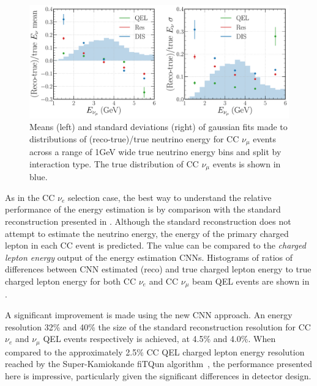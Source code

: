 \begin{figure} %
    \includegraphics[width=\textwidth]{diagrams/7-results/final_energy_numu.pdf}
    \caption[Means and standard deviations of fits to $\nu_{\mu}$ energy distributions]
    {Means (left) and standard deviations (right) of gaussian fits made to distributions of
        (reco-true)/true neutrino energy for CC $\nu_{\mu}$ events across a range of \unit{1}{GeV}
        wide true neutrino energy bins and split by interaction type. The true distribution of CC
        $\nu_{\mu}$ events is shown in blue.}
    \label{fig:final_energy_numu}
\end{figure}

As in the CC $\nu_{e}$ selection case, the best way to understand the relative performance of the
energy estimation is by comparison with the standard \chips reconstruction presented in
. Although the standard reconstruction does not attempt to estimate
the neutrino energy, the energy of the primary charged lepton in each CC event is predicted. The
value can be compared to the \emph{charged lepton energy} output of the energy estimation CNNs.
Histograms of ratios of differences between CNN estimated (reco) and true charged lepton energy to
true charged lepton energy for both CC $\nu_{e}$ and CC $\nu_{\mu}$ beam QEL events are shown in
.

A significant improvement is made using the new CNN approach. An energy resolution 32\% and 40\%
the size of the standard reconstruction resolution for CC $\nu_{e}$ and $\nu_{\mu}$ QEL events
respectively is achieved, at 4.5\% and 4.0\%. When compared to the approximately 2.5\% CC QEL
charged lepton energy resolution reached by the Super-Kamiokande fiTQun
algorithm~\cite{jiang2019}, the performance presented here is impressive, particularly given the
significant differences in detector design.

